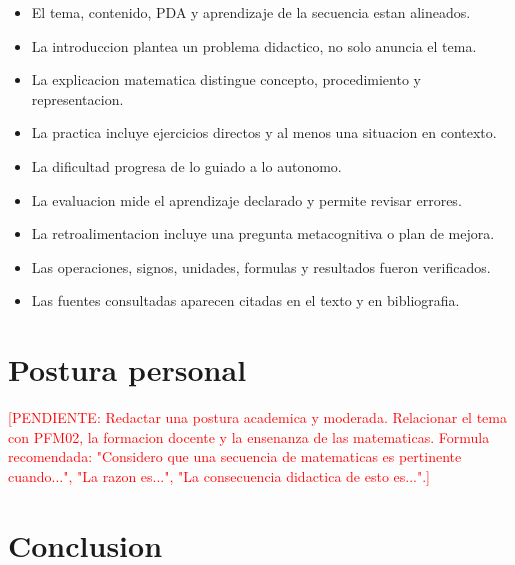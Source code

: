 \documentclass[
	spanish,
	letterpaper, oneside
]{article}
\newcommand{\pendiente}[1]{\textcolor{red}{[PENDIENTE: #1]}}
\begin{document}
\begin{itemize}
	\item El tema, contenido, PDA y aprendizaje de la secuencia estan alineados.
	\item La introduccion plantea un problema didactico, no solo anuncia el tema.
	\item La explicacion matematica distingue concepto, procedimiento y representacion.
	\item La practica incluye ejercicios directos y al menos una situacion en contexto.
	\item La dificultad progresa de lo guiado a lo autonomo.
	\item La evaluacion mide el aprendizaje declarado y permite revisar errores.
	\item La retroalimentacion incluye una pregunta metacognitiva o plan de mejora.
	\item Las operaciones, signos, unidades, formulas y resultados fueron verificados.
	\item Las fuentes consultadas aparecen citadas en el texto y en bibliografia.
\end{itemize}

\section{Postura personal}

\pendiente{Redactar una postura academica y moderada. Relacionar el tema con PFM02, la formacion docente y la ensenanza de las matematicas. Formula recomendada: "Considero que una secuencia de matematicas es pertinente cuando...", "La razon es...", "La consecuencia didactica de esto es...".}

\section{Conclusion}
\end{document}

